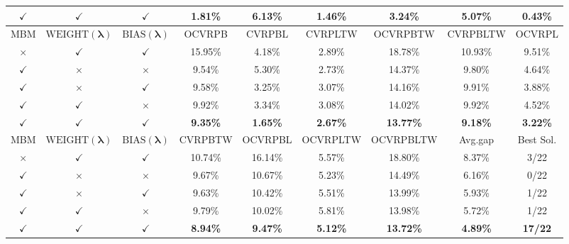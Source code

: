 \documentclass{article}
\theoremstyle{plain}
\theoremstyle{definition}
\theoremstyle{remark}
\begin{document}
\begin{table}[htbp]
{\begin{tabular}{ccc|c|c|c|c|c|c}
    $\checkmark$     & $\checkmark$     & $\checkmark$   & \cellcolor[HTML]{D0CECE}\textbf{1.81\%} & 6.13\% & \cellcolor[HTML]{D0CECE}\textbf{1.46\%} & \cellcolor[HTML]{D0CECE}\textbf{3.24\%} & 5.07\% & \cellcolor[HTML]{D0CECE}\textbf{0.43\%} \\
    \midrule
    \midrule
    MBM   & $\mathrm{WEIGHT}(\bm{\lambda})$ & $\mathrm{BIAS}(\bm{\lambda})$ & OCVRPB & CVRPBL & CVRPLTW & OCVRPBTW & CVRPBLTW & OCVRPL \\
    \midrule
    $\times$ & $\checkmark$     & $\checkmark$   & 15.95\% & 4.18\% & 2.89\% & 18.78\% & 10.93\% & 9.51\% \\
    $\checkmark$     & $\times$     & $\times$ & 9.54\% & 5.30\% & 2.73\% & 14.37\% & 9.80\% & 4.64\% \\
   $\checkmark$     & $\times$     & $\checkmark$  & 9.58\% & 3.25\% & 3.07\% & 14.16\% & 9.91\% & 3.88\% \\
    $\checkmark$     & $\checkmark$ & $\times$& 9.92\% & 3.34\% & 3.08\% & 14.02\% & 9.92\% & 4.52\% \\
   $\checkmark$     & $\checkmark$     & $\checkmark$    & \cellcolor[HTML]{D0CECE}\textbf{9.35\%} & \cellcolor[HTML]{D0CECE}\textbf{1.65\%} & \cellcolor[HTML]{D0CECE}\textbf{2.67\%} & \cellcolor[HTML]{D0CECE}\textbf{13.77\%} & \cellcolor[HTML]{D0CECE}\textbf{9.18\%} & \cellcolor[HTML]{D0CECE}\textbf{3.22\%} \\
    \midrule
    \midrule
    MBM   & $\mathrm{WEIGHT}(\bm{\lambda})$ & $\mathrm{BIAS}(\bm{\lambda})$ & CVRPBTW & OCVRPBL & OCVRPLTW & OCVRPBLTW & Avg.gap & Best Sol. \\
    \midrule
    $\times$ & $\checkmark$     & $\checkmark$    & 10.74\% & 16.14\% & 5.57\% & 18.80\% & 8.37\% & 3/22 \\
    $\checkmark$     & $\times$     & $\times$ & 9.67\% & 10.67\% & 5.23\% & 14.49\% & 6.16\% & 0/22 \\
   $\checkmark$     & $\times$     & $\checkmark$ & 9.63\% & 10.42\% & 5.51\% & 13.99\% & 5.93\% & 1/22 \\
    $\checkmark$     & $\checkmark$ & $\times$& 9.79\% & 10.02\% & 5.81\% & 13.98\% & 5.72\% & 1/22 \\
   $\checkmark$     & $\checkmark$     & $\checkmark$    & \cellcolor[HTML]{D0CECE}\textbf{8.94\%} & \cellcolor[HTML]{D0CECE}\textbf{9.47\%} & \cellcolor[HTML]{D0CECE}\textbf{5.12\%} & \cellcolor[HTML]{D0CECE}\textbf{13.72\%} & \cellcolor[HTML]{D0CECE}\textbf{4.89\%} & \cellcolor[HTML]{D0CECE}\textbf{17/22} \\
    \bottomrule[0.5mm]
    \end{tabular}%
    }
  \label{tab:ablation_hyper_bias}%
\end{table}%
\end{document}
